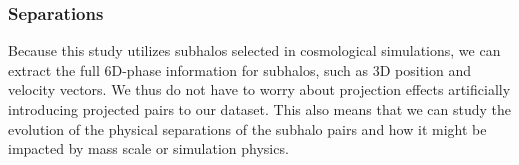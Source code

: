\documentclass[twocolumn]{aastex63}
\newcommand\ID{\textit{Illustris-Dark}}
\newcommand\IH{\textit{Illustris-Hydro}}
\newcommand{\gb}[1]{\textcolor{olive}{\textbf{#1}} }
\begin{document}
 \subsubsection{Separations}

Because this study utilizes subhalos selected in
cosmological simulations, we can extract the
full 6D-phase information for subhalos, such as 3D position and velocity vectors. 
We thus do not have to worry about projection effects artificially introducing projected pairs to our dataset. This also means that we can study the evolution of the physical separations of the subhalo pairs and how it might be impacted by mass scale or simulation physics. %
\end{document}

